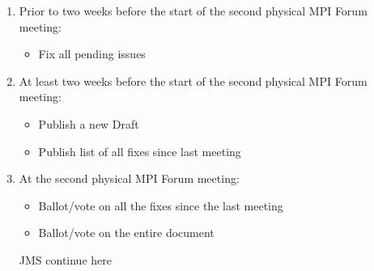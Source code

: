 {{\begin{enumerate}
{\Huge JMS continue here}



\item Prior to two weeks before the start of the second physical MPI
  Forum meeting:
  \begin{itemize}
  \item Fix all pending issues
  \end{itemize}

\item At least two weeks before the start of the second physical MPI
  Forum meeting:
  \begin{itemize}
  \item Publish a new Draft
  \item Publish list of all fixes since last meeting
  \end{itemize}

\item At the second physical MPI Forum meeting:
  \begin{itemize}
  \item Ballot/vote on all the fixes since the last meeting
  \item Ballot/vote on the entire document
  \end{itemize}








{\Huge JMS continue here}




\end{enumerate}}}
